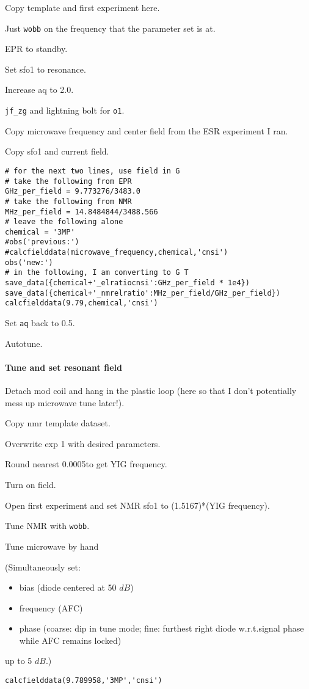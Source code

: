\begin{scriptsize}
\begin{python}[off]
Copy template and first experiment here.

Just \texttt{wobb} on the frequency that the parameter set is at.

EPR to standby.

Set sfo1 to resonance.

Increase aq to 2.0.  

\texttt{jf\_zg} and lightning bolt for \texttt{o1}.  

Copy microwave frequency and center field from the ESR experiment I ran.

Copy sfo1 and current field.

\begin{lstlisting}
# for the next two lines, use field in G
# take the following from EPR
GHz_per_field = 9.773276/3483.0
# take the following from NMR
MHz_per_field = 14.8484844/3488.566
# leave the following alone
chemical = '3MP'
#obs('previous:')
#calcfielddata(microwave_frequency,chemical,'cnsi')
obs('new:')
# in the following, I am converting to G T
save_data({chemical+'_elratiocnsi':GHz_per_field * 1e4})
save_data({chemical+'_nmrelratio':MHz_per_field/GHz_per_field})
calcfielddata(9.79,chemical,'cnsi')
\end{lstlisting}

Set \texttt{aq} back to 0.5.

Autotune.
\paragraph{Tune and set resonant field}
Detach mod coil and hang in the plastic loop (here so that I don't potentially mess up microwave tune later!).

Copy nmr template dataset.

Overwrite exp 1 with desired parameters.

Round nearest 0.0005\GHz to get YIG frequency.

Turn on field.

Open first experiment and set NMR sfo1 to (1.5167)*(YIG frequency).

Tune NMR with {\tt wobb}.


Tune microwave by hand
{\small (Simultaneously set:
\begin{itemize}
    \item bias (diode centered at 50 $dB$)
    \item frequency (AFC)
    \item phase (coarse: dip in tune mode; fine: furthest right diode w.r.t.signal phase while AFC remains locked)
\end{itemize}
up to 5 $dB$.)}
\begin{lstlisting}
calcfielddata(9.789958,'3MP','cnsi')
\end{lstlisting}


\end{python}
\end{scriptsize}
